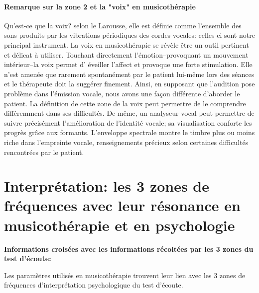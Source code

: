  \paragraph{Remarque sur la zone 2 et la "voix" en musicothérapie}
Qu'est-ce que la voix? selon le Larousse, elle est définie comme
l'ensemble des sons produits par les vibrations périodiques des
cordes vocales: celles-ci sont notre principal instrument.
La voix en musicothérapie se révèle être un outil pertinent et délicat
à utiliser. Touchant 
directement 
l'émotion--provoquant un mouvement intérieur--la voix permet d'
éveiller l'affect
et provoque une forte stimulation. Elle n'est amenée que rarement
spontanément par le patient lui-même lors des séances et le thérapeute doit la suggérer
finement.
Ainsi, en supposant que l'audition pose problème dans l'émission
vocale, nous avons une façon différente d'aborder le patient. La
définition de cette
zone de la voix peut permettre de le comprendre différemment dans ses difficultés. 
De même, un analyseur vocal peut permettre de suivre précisément l'amélioration de
l'identité vocale; sa visualisation conforte les progrès grâce aux
formants. L'enveloppe spectrale montre le timbre plus ou moins riche
dans l'empreinte vocale, renseignements précieux selon certaines
difficultés rencontrées par le patient.
       


\section{Interprétation: les 3 zones de fréquences avec leur résonance en musicothérapie et en
  psychologie}


	\textbf{Informations croisées avec les informations récoltées par les 3 
          zones du test d'écoute:}
          
Les paramètres utilisés en musicothérapie trouvent leur lien avec les
3 zones de fréquences d'interprétation psychologique du test d'écoute.

